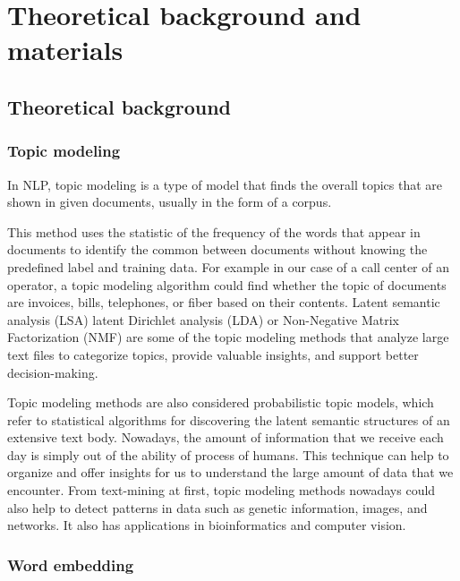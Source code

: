 \chapter{Theoretical background and materials}

\startcontents[chapters]
\printmyminitoc{
    
}



\section{Theoretical background}

\subsection{Topic modeling}

In NLP, topic modeling is a type of model that finds the overall topics that are shown in given documents, usually in the form of a corpus.

This method uses the statistic of the frequency of the words that appear in documents to identify the common between documents without knowing the predefined label and training data. For example in our case of a call center of an operator, a topic modeling algorithm could find whether the topic of documents are invoices, bills, telephones, or fiber based on their contents. Latent semantic analysis (LSA)\cite{deerwester-indexing-1990} latent Dirichlet analysis (LDA)\cite{944937} or Non-Negative Matrix Factorization (NMF)\cite{conf/nips/LeeS00} are some of the topic modeling methods that analyze large text files to categorize topics, provide valuable insights, and support better decision-making.

Topic modeling methods are also considered probabilistic topic models, which refer to statistical algorithms for discovering the latent semantic structures of an extensive text body. Nowadays, the amount of information that we receive each day is simply out of the ability of process of humans. This technique can help to organize and offer insights for us to understand the large amount of data that we encounter. From text-mining at first, topic modeling methods nowadays could also help to detect patterns in data such as genetic information, images, and networks. It also has applications in bioinformatics and computer vision.

\subsection{Word embedding}

